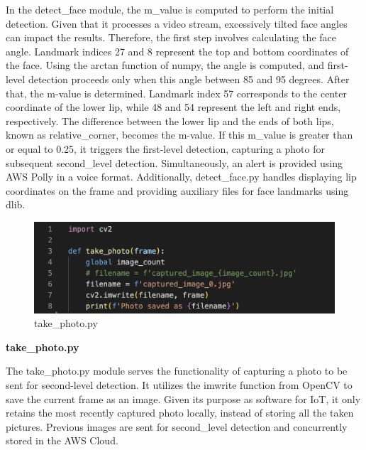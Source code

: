 In the detect\_face module, the m\_value is computed to perform the initial detection. Given that it processes a video stream, excessively tilted face angles can impact the results. Therefore, the first step involves calculating the face angle. Landmark indices 27 and 8 represent the top and bottom coordinates of the face. Using the arctan function of numpy, the angle is computed, and first-level detection proceeds only when this angle between 85 and 95 degrees. After that, the m-value is determined. Landmark index 57 corresponds to the center coordinate of the lower lip, while 48 and 54 represent the left and right ends, respectively. The difference between the lower lip and the ends of both lips, known as relative\_corner, becomes the m-value. If this m\_value is greater than or equal to 0.25, it triggers the first-level detection, capturing a photo for subsequent second\_level detection. Simultaneously, an alert is provided using AWS Polly in a voice format. Additionally, detect\_face.py handles displaying lip coordinates on the frame and providing auxiliary files for face landmarks using dlib.\\

\begin{figure}[h]
    \centering
    \includegraphics[width=0.5\linewidth]{images/take_photo.png}
    \caption{take\_photo.py}
    \label{fig:enter-label}
\end{figure}

\textbf{take\_photo.py}

The take\_photo.py module serves the functionality of capturing a photo to be sent for second-level detection. It utilizes the imwrite function from OpenCV to save the current frame as an image. Given its purpose as software for IoT, it only retains the most recently captured photo locally, instead of storing all the taken pictures. Previous images are sent for second\_level detection and concurrently stored in the AWS Cloud.\\

